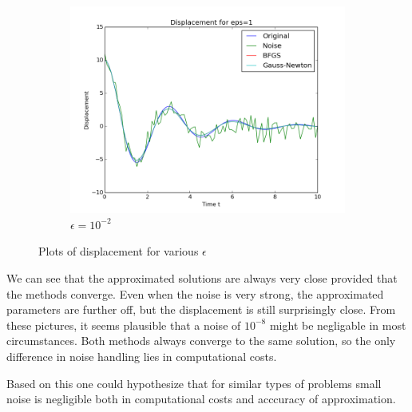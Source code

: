 \documentclass{article}
\begin{document}
\begin{figure}
\begin{subfigure}[b]{0.45\textwidth}
        \includegraphics[width=\textwidth]{noise1}
        \caption{$\epsilon=10^{-2}$}
        \label{fig:mouse}
    \end{subfigure}
    \caption{Plots of displacement for various $\epsilon$}\label{fig:animals}
\end{figure}
We can see that the approximated solutions are always very close provided that the methods
converge. Even when the noise is very strong, the approximated parameters are further off, but the displacement is still surprisingly close. From these pictures, it seems plausible
that a noise of $10^{-8}$ might be negligable in most circumstances.
Both methods always converge to the same solution, so the only difference in noise handling lies in computational costs.\par
 Based on this one could hypothesize that for similar types of problems small
noise is negligible both in computational costs and acccuracy of approximation.
\end{document}
